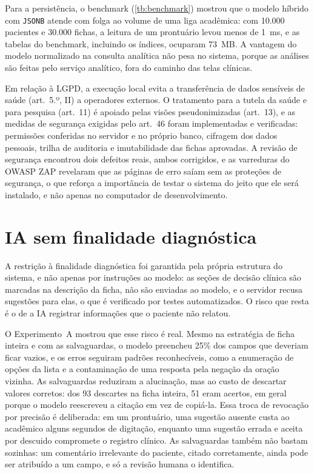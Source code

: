 Para a persistência, o benchmark (\autoref{tb:benchmark}) mostrou que o modelo híbrido com \texttt{JSONB} atende com folga ao volume de uma liga acadêmica: com 10.000 pacientes e 30.000 fichas, a leitura de um prontuário levou menos de 1~ms, e as tabelas do benchmark, incluindo os índices, ocuparam 73~MB. A vantagem do modelo normalizado na consulta analítica não pesa no sistema, porque as análises são feitas pelo serviço analítico, fora do caminho das telas clínicas.

Em relação à LGPD, a execução local evita a transferência de dados sensíveis de saúde (art.~5.º, II) a operadores externos. O tratamento para a tutela da saúde e para pesquisa (art.~11) é apoiado pelas visões pseudonimizadas (art.~13), e as medidas de segurança exigidas pelo art.~46 foram implementadas e verificadas: permissões conferidas no servidor e no próprio banco, cifragem dos dados pessoais, trilha de auditoria e imutabilidade das fichas aprovadas. A revisão de segurança encontrou dois defeitos reais, ambos corrigidos, e as varreduras do OWASP ZAP revelaram que as páginas de erro saíam sem as proteções de segurança, o que reforça a importância de testar o sistema do jeito que ele será instalado, e não apenas no computador de desenvolvimento.

\section{IA sem finalidade diagnóstica}

A restrição à finalidade diagnóstica foi garantida pela própria estrutura do sistema, e não apenas por instruções ao modelo: as seções de decisão clínica são marcadas na descrição da ficha, não são enviadas ao modelo, e o servidor recusa sugestões para elas, o que é verificado por testes automatizados. O risco que resta é o de a IA registrar informações que o paciente não relatou.

O Experimento~A mostrou que esse risco é real. Mesmo na estratégia de ficha inteira e com as salvaguardas, o modelo preencheu 25\% dos campos que deveriam ficar vazios, e os erros seguiram padrões reconhecíveis, como a enumeração de opções da lista e a contaminação de uma resposta pela negação da oração vizinha. As salvaguardas reduziram a alucinação, mas ao custo de descartar valores corretos: dos 93 descartes na ficha inteira, 51 eram acertos, em geral porque o modelo reescreveu a citação em vez de copiá-la. Essa troca de revocação por precisão é deliberada: em um prontuário, uma sugestão ausente custa ao acadêmico alguns segundos de digitação, enquanto uma sugestão errada e aceita por descuido compromete o registro clínico. As salvaguardas também não bastam sozinhas: um comentário irrelevante do paciente, citado corretamente, ainda pode ser atribuído a um campo, e só a revisão humana o identifica.

